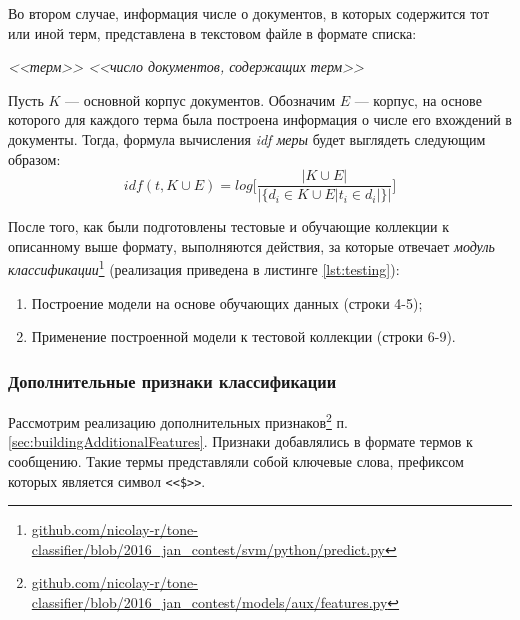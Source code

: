     Во втором случае, информация числе о документов, в которых содержится тот или
    иной терм, представлена в текстовом файле в формате списка:
    \begin{center}
        \it
        <<терм>> <<число документов, содержащих терм>>
    \end{center}

    Пусть $K$ --- основной корпус документов.
    Обозначим $E$ --- корпус, на основе которого для каждого терма была построена
    информация о числе его вхождений в документы.
    Тогда, формула вычисления {\it idf меры} будет выглядеть
    следующим образом:
    \begin{equation}
        idf(t, K \cup E) = log \Bigg[ \dfrac{|K \cup E|}{|\{d_i \in K \cup E | t_i \in d_i|\}|} \Bigg]
    \end{equation}

    После того, как были подготовлены тестовые и обучающие коллекции к
    описанному выше формату, выполняются действия, за которые
    отвечает {\it модуль классификации}\footnote{
        \url{github.com/nicolay-r/tone-classifier/blob/2016_jan_contest/svm/python/predict.py}
    } (реализация приведена в листинге
    \ref{lst:testing}):
    \begin{enumerate}
        \item Построение модели на основе обучающих данных (строки 4-5);
        \item Применение построенной модели к тестовой коллекции (строки 6-9).
    \end{enumerate}

    \lstset{style=python}
    


    \subsubsection{Дополнительные признаки классификации}
    Рассмотрим реализацию дополнительных признаков\footnote{ \url{github.com/nicolay-r/tone-classifier/blob/2016_jan_contest/models/aux/features.py} }
    п. \ref{sec:buildingAdditionalFeatures}.
    Признаки добавлялись в формате термов к сообщению.
    Такие термы представляли собой ключевые слова, префиксом которых является
    символ {\tt <<\$>>}.

